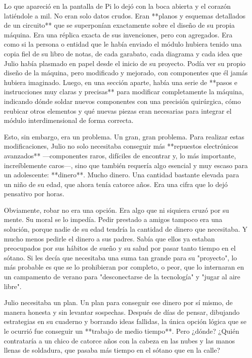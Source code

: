 \documentclass[a4paper,12pt]{book}
\begin{document}
Lo que apareció en la pantalla de Pi lo dejó con la boca abierta y el corazón latiéndole a mil. No eran solo datos crudos. Eran **planos y esquemas detallados de un circuito** que se superponían exactamente sobre el diseño de su propia máquina. Era una réplica exacta de sus invenciones, pero con agregados. Era como si la persona o entidad que le había enviado el módulo hubiera tenido una copia fiel de su libro de notas, de cada garabato, cada diagrama y cada idea que Julio había plasmado en papel desde el inicio de su proyecto. Podía ver su propio diseño de la máquina, pero modificado y mejorado, con componentes que él jamás hubiera imaginado. Luego, en una sección aparte, había una serie de **pasos e instrucciones muy claras y precisas** para modificar completamente la máquina, indicando dónde soldar nuevos componentes con una precisión quirúrgica, cómo reubicar otros elementos y qué nuevas piezas eran necesarias para integrar el módulo interdimensional de forma correcta.

Esto, sin embargo, era un problema. Un gran, gran problema. Para realizar estas modificaciones, Julio no solo necesitaba conseguir más **repuestos electrónicos avanzados** —componentes raros, difíciles de encontrar y, lo más importante, increíblemente caros—, sino que también requería algo esencial y muy escaso para un adolescente: **dinero**. Mucho dinero. Una cantidad bastante elevada para un niño de su edad, que ahora tenía catorce años. Era una cifra que lo dejó pensativo por horas.

Obviamente, robar no era una opción. Era algo que ni siquiera cruzó por su mente. Su moral se lo impedía. Pedir prestado a amigos tampoco era una solución, porque nadie de su edad tendría la cantidad de dinero que necesitaba. Y mucho menos pedirle el dinero a sus padres. Sabía que ellos ya estaban preocupados por sus hábitos de sueño y su salud por pasar tanto tiempo en el sótano. Si les decía que necesitaba una suma tan grande para su "proyecto", lo más probable es que se lo prohibieran por completo, o peor, que lo internaran en un campamento de verano para "desconectarse de la tecnología" y "jugar al aire libre".

Julio necesitaba un plan. Un plan para conseguir ese dinero por sí mismo, de manera honesta y sin levantar sospechas. Después de días de pensar, dibujando estrategias en su cuaderno y borrando ideas fallidas, la única opción lógica que se le ocurrió fue conseguir un **trabajo de medio tiempo**. Pero ¿dónde? ¿Quién contrataría a un chico de catorce años con la cabeza en las nubes y las manos llenas de soldadura, que pasaba más tiempo en el sótano que en la calle?
\end{document}
